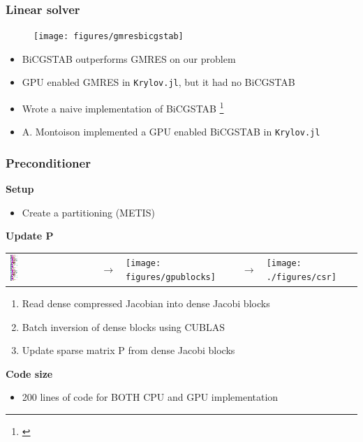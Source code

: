 \begin{frame}
  \frametitle{Linear solver}
    \begin{figure}
      \texttt{[image: figures/gmresbicgstab]}
    \end{figure}
  \begin{itemize}
    \item BiCGSTAB outperforms GMRES on our problem
    \item GPU enabled GMRES in \lstinline{Krylov.jl}, but it had no BiCGSTAB 
    \item Wrote a naive implementation of BiCGSTAB \footnote{\cite{bicgstabVorst}}
    \item A. Montoison implemented a GPU enabled BiCGSTAB in \lstinline{Krylov.jl}
  \end{itemize}
\end{frame}

\begin{frame}
  \frametitle{Preconditioner}
  {\bf Setup}
  \begin{itemize}
    \item Create a partitioning (METIS)
  \end{itemize}
  {\bf Update P}
  \begin{tabular}{m{}m{}m{}m{}m{}}
        \includegraphics[width=0.09\textwidth]{./figures/compressed_coloring.PNG}
    &
    {\Huge $\rightarrow$}
    &
        \texttt{[image: figures/gpublocks]}
    &
    {\Huge $\rightarrow$}
    &
        \texttt{[image: ./figures/csr]}
    \\
  \end{tabular}
    \begin{enumerate}
      \item Read dense compressed Jacobian into dense Jacobi blocks
      \item Batch inversion of dense blocks using CUBLAS
      \item Update sparse matrix P from dense Jacobi blocks
    \end{enumerate}
  {\bf Code size}
  \begin{itemize}
    \item 200 lines of code for BOTH CPU and GPU implementation
  \end{itemize}
\end{frame}

